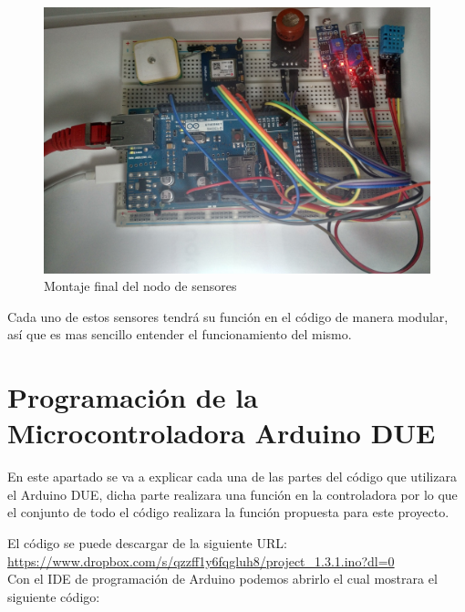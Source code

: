 \begin{figure}[!h]
	\centering
	\includegraphics[width=0.7\linewidth]{figuras/montfin}
	\caption{Montaje final del nodo de sensores}
	\label{fig:montfin}
\end{figure}

Cada uno de estos sensores tendrá su función en el código de manera modular, así que es mas sencillo entender el funcionamiento del mismo.

\section{Programación de la Microcontroladora Arduino DUE}

\setlength{\parindent}{5ex}En este apartado se va a explicar cada una de las partes del código que utilizara el Arduino DUE, dicha parte realizara una función en la controladora por lo que el conjunto de todo el código realizara la función propuesta para este proyecto.
\setlength{\parindent}{0ex}

El código se puede descargar de la siguiente URL: \url{https://www.dropbox.com/s/qzzff1y6fqgluh8/project_1.3.1.ino?dl=0}\\

Con el IDE de programación de Arduino podemos abrirlo el cual mostrara el siguiente código:


